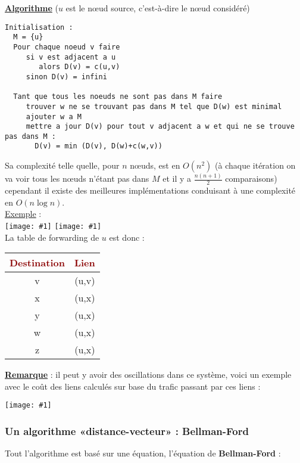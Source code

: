 \documentclass{article}
\newcommand{\dred}[1]{\textcolor{darkred}{\textbf{#1}}}
\newcommand{\imageR}[2]{\texttt{[image: \#1]}}
\newcommand{\imgR}[2]{\begin{center}\texttt{[image: \#1]}\end{center}}
\begin{document}
\noindent\textbf{\underline{Algorithme}} ($u$ est le n\oe ud source, c'est-à-dire le n\oe ud considéré)
\begin{lstlisting}
Initialisation :
  M = {u}
  Pour chaque noeud v faire
     si v est adjacent a u
        alors D(v) = c(u,v)
     sinon D(v) = infini
  
  Tant que tous les noeuds ne sont pas dans M faire
     trouver w ne se trouvant pas dans M tel que D(w) est minimal
     ajouter w a M
     mettre a jour D(v) pour tout v adjacent a w et qui ne se trouve pas dans M :
       D(v) = min (D(v), D(w)+c(w,v))
\end{lstlisting}

Sa complexité telle quelle, pour $n$ n\oe uds, est en $O(n^2)$ (à chaque itération on va voir tous les n\oe uds 
n'étant pas dans $M$ et il y a $\frac{n(n+1)}{2}$ comparaisons) cependant il existe des meilleures 
implémentations conduisant à une complexité en $O(n\log n)$. \\

\underline{Exemple} : \\
\imageR{CN_085.png}{300} \imageR{CN_086.png}{150} \\

La table de forwarding de $u$ est donc : 

\begin{center}
	\begin{tabular}{|*{2}{c|}}
	\hline
	\dred{Destination} & \dred{Lien} \\
	\hline
	v & (u,v)\\
	\hline
	x & (u,x)\\
	\hline
	y & (u,x)\\
	\hline
	w & (u,x)\\
	\hline
	z & (u,x)\\
	\hline
	\end{tabular}
\end{center}
\newpage
\textbf{\underline{Remarque}} : il peut y avoir des oscillations dans ce système, voici un exemple avec le coût 
des liens calculés sur base du trafic passant par ces liens : 

\imgR{CN_087.png}{300}

\subsubsection{Un algorithme «distance-vecteur» : Bellman-Ford}

Tout l'algorithme est basé sur une équation, l'équation de \textbf{Bellman-Ford} : 
\end{document}
